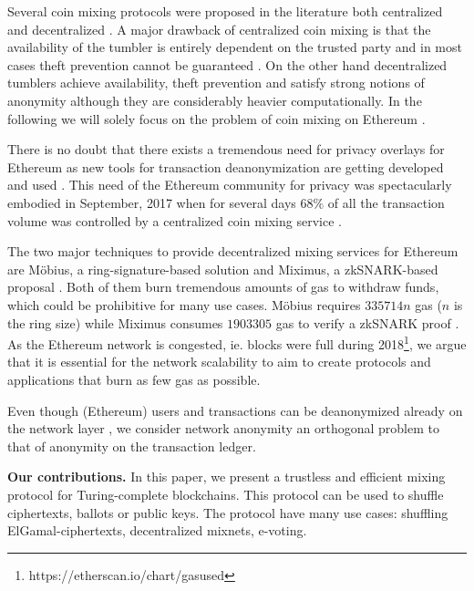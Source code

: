 \documentclass[a4paper,UKenglish,cleveref, autoref]{oasics-v2019}
\begin{document}
Several coin mixing protocols were proposed in the literature both centralized \cite{bonneau2014mixcoin,valenta2015blindcoin,heilman2017tumblebit} and decentralized \cite{maxwell2013coinjoin,ruffing2014coinshuffle,miximus2018,meiklejohn2018mobius,bissias2014sybil}. A major drawback of centralized coin mixing is that the availability of the tumbler is entirely dependent on the trusted party and in most cases theft prevention cannot be guaranteed \cite{bonneau2014mixcoin,valenta2015blindcoin}. On the other hand decentralized tumblers achieve availability, theft prevention and satisfy strong notions of anonymity although they are considerably heavier computationally. In the following we will solely focus on the problem of coin mixing on Ethereum \cite{wood2014ethereum}. 

There is no doubt that there exists a tremendous need for privacy overlays for Ethereum as new tools for transaction deanonymization are getting developed and used \cite{chan2017ethereum}. This need of the Ethereum community for privacy was spectacularly embodied in September, 2017 when for several days $68\%$ of all the transaction volume was controlled by a centralized coin mixing service \cite{hugemixer2017}.

The two major techniques to provide decentralized mixing services for Ethereum are Möbius, a ring-signature-based solution \cite{meiklejohn2018mobius} and Miximus, a zkSNARK-based proposal \cite{miximus2018}. Both of them burn tremendous amounts of gas to withdraw funds, which could be prohibitive for many use cases. Möbius requires $\num[group-separator={,}]{335714}n$ gas ($n$ is the ring size) while Miximus consumes $\num[group-separator={,}]{1903305}$ gas to verify a zkSNARK proof \cite{miximus2018gascost}. As the Ethereum network is congested, ie. blocks were full during 2018\footnote{https://etherscan.io/chart/gasused}, we argue that it is essential for the network scalability to aim to create protocols and applications that burn as few gas as possible. 

Even though (Ethereum) users and transactions can be deanonymized already on the network layer \cite{ethmacrofag2016}, we consider network anonymity an orthogonal problem to that of anonymity on the transaction ledger.    

\textbf{Our contributions.} In this paper, we present a trustless and efficient mixing protocol for Turing-complete blockchains. This protocol can be used to shuffle ciphertexts, ballots or public keys. The protocol have many use cases: shuffling ElGamal-ciphertexts, decentralized mixnets, e-voting.
\end{document}
